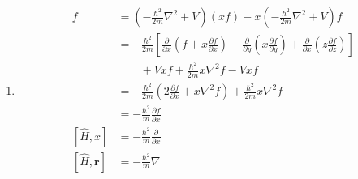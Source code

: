 \documentclass{article}
\renewcommand{\vec}[1]{\boldsymbol{\mathbf{#1}}}
\begin{document}
\begin{enumerate}
  \item

        \begin{align*}
          [\hat{H}, x] f                 & = \left( -\frac{\hbar^2}{2 m} \nabla^2 + V \right) (x f) - x \left( -\frac{\hbar^2}{2 m} \nabla^2 + V \right) f                                                                                                                                                                \\
                                         & = -\frac{\hbar^2}{2 m} \left[ \frac{\partial}{\partial x} \left( f + x \frac{\partial f}{\partial x} \right) + \frac{\partial}{\partial y} \left( x \frac{\partial f}{\partial y} \right) + \frac{\partial}{\partial x} \left( z \frac{\partial f}{\partial z} \right) \right] \\
                                         & \qquad + V x f + \frac{\hbar^2}{2 m} x \nabla^2 f - V x f                                                                                                                                                                                                                      \\
                                         & = -\frac{\hbar^2}{2 m} \left( 2 \frac{\partial f}{\partial x} + x \nabla^2 f \right) + \frac{\hbar^2}{2 m} x \nabla^2 f                                                                                                                                                        \\
                                         & = -\frac{\hbar^2}{m} \frac{\partial f}{\partial x}                                                                                                                                                                                                                             \\
          [\hat{H}, x]                   & = -\frac{\hbar^2}{m} \frac{\partial}{\partial x}                                                                                                                                                                                                                               \\
          [\hat{H}, \vec{r}]             & = -\frac{\hbar^2}{m} \nabla                                                                                                                                                                                                                                                    \\

\end{align*}
\end{enumerate}
\end{document}
